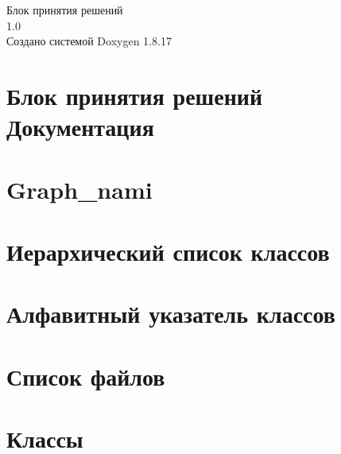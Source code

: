 \let\mypdfximage\pdfximage\def\pdfximage{\immediate\mypdfximage}\documentclass[twoside]{book}
\newcommand{\+}{\discretionary{\mbox{\scriptsize$\hookleftarrow$}}{}{}}
\newcommand{\clearemptydoublepage}{%
  \newpage{\pagestyle{empty}\cleardoublepage}%
}
\begin{document}
\hypersetup{pageanchor=false,
             bookmarksnumbered=true,
             pdfencoding=unicode
            }
\begin{titlepage}
\vspace*{7cm}
\begin{center}%
{\Large Блок принятия решений \\[1ex]\large 1.\+0 }\\
\vspace*{1cm}
{\large Создано системой Doxygen 1.8.17}\\
\end{center}
\end{titlepage}
\clearemptydoublepage
{}
\tableofcontents
\clearemptydoublepage
{}
\hypersetup{pageanchor=true}

\chapter{Блок принятия решений Документация}
\label{index}\hypertarget{index}{}
\chapter{Graph\+\_\+nami}
\label{md__r_e_a_d_m_e}

\chapter{Иерархический список классов}

\chapter{Алфавитный указатель классов}

\chapter{Список файлов}

\chapter{Классы}






















\end{document}
